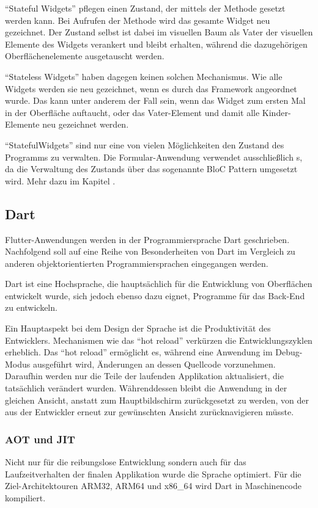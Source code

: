 \enquote{Stateful Widgets} pflegen einen Zustand, der mittels der Methode  gesetzt werden kann. Bei Aufrufen der Methode wird das gesamte Widget neu gezeichnet. Der Zustand selbst ist dabei im visuellen Baum als Vater der visuellen Elemente des Widgets verankert und bleibt erhalten, während die dazugehörigen Oberflächenelemente ausgetauscht werden.

\enquote{Stateless Widgets} haben dagegen keinen solchen Mechanismus. Wie alle Widgets werden sie neu gezeichnet, wenn es durch das Framework angeordnet wurde. Das kann unter anderem der Fall sein, wenn das Widget zum ersten Mal in der Oberfläche auftaucht, oder das Vater-Element und damit alle Kinder-Elemente neu gezeichnet werden.

\enquote{StatefulWidgets} sind nur eine von vielen Möglichkeiten den Zustand des Programms zu verwalten. Die Formular-Anwendung verwendet ausschließlich s, da die Verwaltung des Zustands über das sogenannte BloC Pattern umgesetzt wird. Mehr dazu im Kapitel .


\subsection{Dart}

Flutter-Anwendungen werden in der Programmiersprache Dart geschrieben. Nachfolgend soll auf eine Reihe von Besonderheiten von Dart im Vergleich zu anderen objektorientierten Programmiersprachen eingegangen werden.

Dart ist eine Hochsprache, die hauptsächlich für die Entwicklung von Oberflächen entwickelt wurde, sich jedoch ebenso dazu eignet, Programme für das Back-End zu entwickeln.

Ein Hauptaspekt bei dem Design der Sprache ist die Produktivität des Entwicklers. Mechanismen wie das \enquote{hot reload} verkürzen die Entwicklungszyklen erheblich. Das \enquote{hot reload} ermöglicht es, während eine Anwendung im Debug-Modus ausgeführt wird, Änderungen an dessen Quellcode vorzunehmen. Daraufhin werden nur die Teile der laufenden Applikation aktualisiert, die tatsächlich verändert wurden.  Währenddessen bleibt die Anwendung in der gleichen Ansicht, anstatt zum Hauptbildschirm zurückgesetzt zu werden, von der aus der Entwickler erneut zur gewünschten Ansicht zurücknavigieren müsste.

\subsubsection{AOT und JIT}
Nicht nur für die reibungslose Entwicklung sondern auch für das Laufzeitverhalten der finalen Applikation wurde die Sprache optimiert.
Für die Ziel-Architektouren ARM32, ARM64 und x86_64 wird Dart in Maschinencode kompiliert. 

